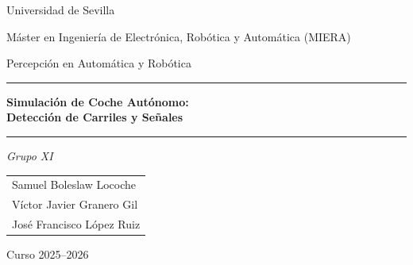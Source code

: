 \documentclass[12pt, a4paper]{article}
\begin{document}

\begin{titlepage}
    \centering
    \vspace*{2cm}
    {\large Universidad de Sevilla \par}
    {\large Máster en Ingeniería de Electrónica, Robótica y Automática (MIERA) \par}
    \vspace{1cm}
    {\large Percepción en Automática y Robótica \par}
    \vspace{2cm}
    \hrule\vspace{0.5cm}
    {\Huge\bfseries Simulación de Coche Autónomo:\\ Detección de Carriles y Señales \par}
    \vspace{0.5cm}\hrule
    \vspace{2cm}
    {\large\itshape Grupo XI \par}
    \vspace{1cm}
    \begin{tabular}{l}
        Samuel Boleslaw Locoche \\[4pt]
        Víctor Javier Granero Gil \\[4pt]
        José Francisco López Ruiz
    \end{tabular}
    \vfill
    {\large Curso 2025--2026 \par}
\end{titlepage}

\tableofcontents
\newpage

\begin{abstract}
Este trabajo presenta el diseño e implementación de un sistema de percepción para un vehículo autónomo simulado en \textit{CARLA Simulator}, integrado con \textit{ROS2 Humble} mediante contenedores Docker. Tras evaluar un primer enfoque basado en líneas horizontales, la detección de carriles se resuelve mediante una red VGG16--U-Net entrenada con el \textit{dataset} TuSimple (TensorFlow/Keras) y exportada a ONNX para inferencia en tiempo real. La detección y clasificación de señales de límite de velocidad (30, 60 y 90~km/h) combina localización por visión clásica (OpenCV en el desarrollo del clasificador; segmentación semántica de CARLA en simulación) con una CNN entrenada en PyTorch sobre GTSRB y un conjunto propio de imágenes. Ambos módulos se integran en un sistema ROS2 con controladores PID de velocidad y dirección, con latencias medias de unos 50~ms en carriles y 13~ms en señales. El código fuente, modelos entrenados, \textit{datasets} y vídeos demostrativos se encuentran en el repositorio público de GitHub: \url{https://github.com/JoseLopez36/Navegacion-Deteccion-Senales}.
\end{abstract}
\end{document}
